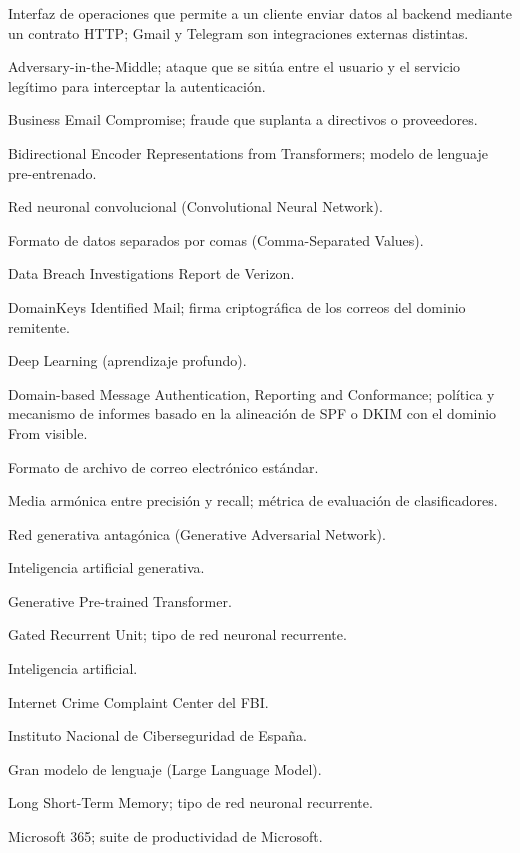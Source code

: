 \documentclass[11pt,a4paper,oneside]{report}
\begin{document}
\begin{description}[style=nextline,leftmargin=3.3cm]
  \item[API] Interfaz de operaciones que permite a un cliente enviar datos al backend mediante un contrato HTTP; Gmail y Telegram son integraciones externas distintas.
  \item[AiTM] Adversary-in-the-Middle; ataque que se sitúa entre el usuario y el servicio legítimo para interceptar la autenticación.
  \item[BEC] Business Email Compromise; fraude que suplanta a directivos o proveedores.
  \item[BERT] Bidirectional Encoder Representations from Transformers; modelo de lenguaje pre-entrenado.
  \item[CNN] Red neuronal convolucional (Convolutional Neural Network).
  \item[CSV] Formato de datos separados por comas (Comma-Separated Values).
  \item[DBIR] Data Breach Investigations Report de Verizon.
  \item[DKIM] DomainKeys Identified Mail; firma criptográfica de los correos del dominio remitente.
  \item[DL] Deep Learning (aprendizaje profundo).
  \item[DMARC] Domain-based Message Authentication, Reporting and Conformance; política y mecanismo de informes basado en la alineación de SPF o DKIM con el dominio From visible.
  \item[EML] Formato de archivo de correo electrónico estándar.
  \item[F1] Media armónica entre precisión y recall; métrica de evaluación de clasificadores.
  \item[GAN] Red generativa antagónica (Generative Adversarial Network).
  \item[GenAI] Inteligencia artificial generativa.
  \item[GPT] Generative Pre-trained Transformer.
  \item[GRU] Gated Recurrent Unit; tipo de red neuronal recurrente.
  \item[IA] Inteligencia artificial.
  \item[IC3] Internet Crime Complaint Center del FBI.
  \item[INCIBE] Instituto Nacional de Ciberseguridad de España.
  \item[LLM] Gran modelo de lenguaje (Large Language Model).
  \item[LSTM] Long Short-Term Memory; tipo de red neuronal recurrente.
  \item[M365] Microsoft 365; suite de productividad de Microsoft.

\end{description}
\end{document}
